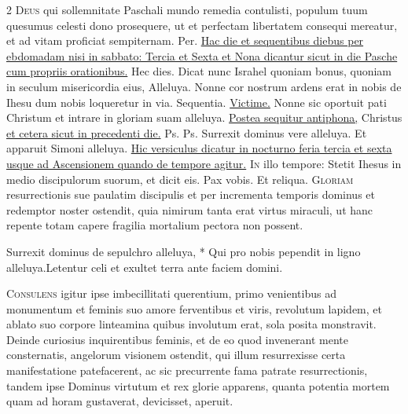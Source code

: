 \begin{multicols*}{2}
\lettrine[lines=2]{\zallmancaps \color{Red} D}{eus} qui sollemnitate Paschali mundo remedia contulisti, populum tuum quesumus celesti dono prosequere, ut et perfectam libertatem consequi mereatur, et ad vitam proficiat sempiternam. Per.
\newline \ul{Hac die et sequentibus diebus per ebdomadam nisi in sabbato: Tercia et Sexta et Nona dicantur sicut in die Pasche cum propriis orationibus.}
 \R Hec dies. \V Dicat nunc Israhel quoniam bonus, quoniam in seculum misericordia eius, Alleluya. \V Nonne cor nostrum ardens erat in nobis de Ihesu dum nobis loqueretur in via. {\color{Red} Sequentia.} \hyperlink{victime-paschali-laudes}{Victime.}
 Nonne sic oportuit pati Christum et intrare in gloriam suam alleluya. \ul{Postea sequitur antiphona,} Christus \ul{et cetera sicut in precedenti die.}
  {\color{Red} Ps.}  {\color{Red} Ps.}  \V Surrexit dominus vere alleluya. \R Et apparuit Simoni alleluya.
\newline \ul{Hic versiculus dicatur in nocturno feria tercia et sexta usque ad Ascensionem quando de tempore agitur.}
\lettrine[lines=2]{\zallmancaps \color{Blue} I}{n} illo tempore: Stetit Ihesus in medio discipulorum suorum, et dicit eis. Pax vobis. Et reliqua.
\lettrine[lines=2]{\zallmancaps \color{Red} G}{loriam} resurrectionis sue paulatim discipulis et per incrementa temporis dominus et redemptor noster ostendit, quia nimirum tanta erat virtus miraculi, ut hanc repente totam capere fragilia mortalium pectora non possent.
\begin{responsory}
{Surrexit dominus de sepulchro alleluya, * Qui pro nobis pependit in ligno alleluya.}{Letentur celi et exultet terra ante faciem domini.}
\end{responsory}%
\lettrine[lines=2]{\zallmancaps \color{Blue} C}{onsulens} igitur ipse imbecillitati querentium, primo venientibus ad monumentum et feminis suo amore ferventibus et viris, revolutum lapidem, et ablato suo corpore linteamina quibus involutum erat, sola posita monstravit. Deinde curiosius inquirentibus feminis, et de eo quod invenerant mente consternatis, angelorum visionem ostendit, qui illum resurrexisse certa manifestatione patefacerent, ac sic precurrente fama patrate resurrectionis, tandem ipse Dominus virtutum et rex glorie apparens, quanta potentia mortem quam ad horam gustaverat, devicisset, aperuit.

\end{multicols*}
